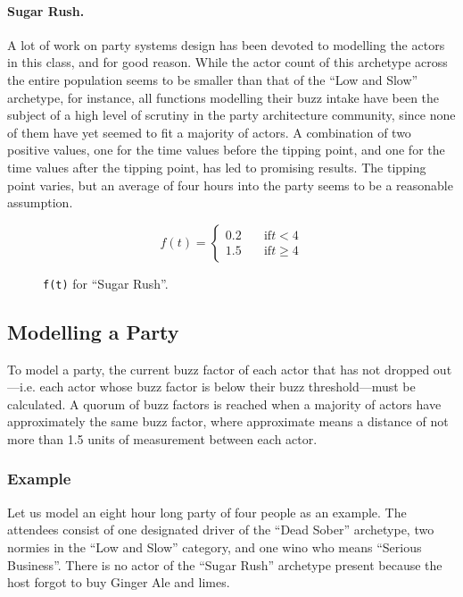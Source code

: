 \documentclass[twocolumn]{article}
\begin{document}
\paragraph{Sugar Rush.} A lot of work on party systems design has been devoted
to modelling the actors in this class, and for good reason. While the actor
count of this archetype across the entire population seems to be smaller than
that of the “Low and Slow” archetype, for instance, all functions modelling
their buzz intake have been the subject of a high level of scrutiny in the
party architecture community, since none of them have yet seemed to fit a
majority of actors. A combination of two positive values, one for the time
values before the tipping point, and one for the time values after the tipping
point, has led to promising results. The tipping point varies, but an average of
four hours into the party seems to be a reasonable assumption.

\begin{figure}[H]
\[ f(t) =
  \begin{cases}
    0.2       & \quad \text{if} t < 4\\
    1.5       & \quad \text{if} t \geq 4
  \end{cases}
\]
\caption{\texttt{f(t)} for “Sugar Rush”.}
\end{figure}

\subsection{Modelling a Party}

To model a party, the current buzz factor of each actor that has not dropped
out—i.e. each actor whose buzz factor is below their buzz threshold—must be
calculated. A quorum of buzz factors is reached when a majority of actors have
approximately the same buzz factor, where approximate means a distance of not
more than 1.5 units of measurement between each actor.

\subsubsection{Example}

Let us model an eight hour long party of four people as an example. The
attendees consist of one designated driver of the “Dead Sober” archetype, two
normies in the “Low and Slow” category, and one wino who means “Serious
Business”. There is no actor of the “Sugar Rush” archetype present because the
host forgot to buy Ginger Ale and limes.
\end{document}
